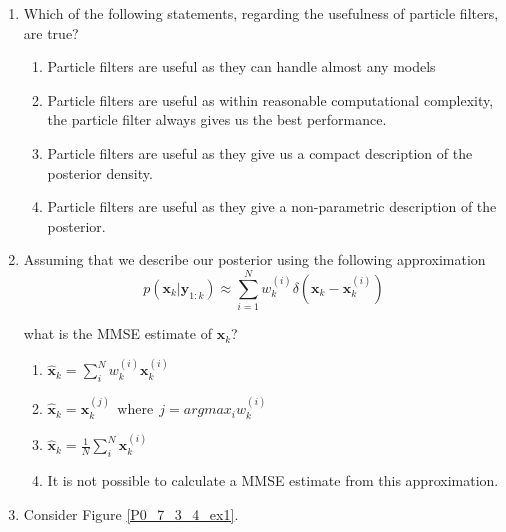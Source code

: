 \begin{enumerate}
\item Which of the following statements, regarding the usefulness of particle filters, are true?


\begin{enumerate}
\item Particle filters are useful as they can handle almost any models
\item Particle filters are useful as within reasonable computational complexity, the particle filter always gives us the best performance. 
\item Particle filters are useful as they give us a compact description of the posterior density. 
\item Particle filters are useful as they give a non-parametric description of the posterior.
\end{enumerate}
\item Assuming that we describe our posterior using the following approximation
\begin{equation}
p(\mathbf{x}_k | \mathbf{y}_{1:k}) \approx \sum_{i=1}^N w_{k}^{(i)} \delta (\mathbf{x}_k -\mathbf{x}_{k}^{(i)})
\end{equation}

what is the MMSE estimate of $\mathbf{x}_k$?
\begin{enumerate}
\item $\hat{\mathbf{x}}_k = \sum_{i}^{N} w_{k}^{(i)} \mathbf{x}_{k}^{(i)}$
\item $\hat{\mathbf{x}}_k = \mathbf{x}_{k}^{(j)} ~~ \text{where} ~~ j = argmax_i w_{k}^{(i)}$
\item $\hat{\mathbf{x}}_k = \frac{1}{N}\sum_{i}^{N}  \mathbf{x}_{k}^{(i)}$
\item It is not possible to calculate a MMSE estimate from this approximation. 
\end{enumerate}
\item Consider Figure \ref{P0_7_3_4_ex1}.


\end{enumerate}
